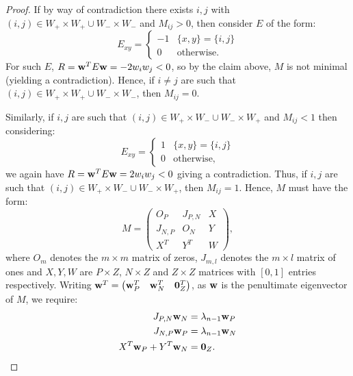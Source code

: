 \documentclass[12pt]{article}
\begin{document}
\begin{proof}
    If by way of contradiction there exists $i,j$ with $(i,j) \in W_{+}\times W_{+} \cup W_{-}\times W_{-}$ and $M_{ij} > 0$, then consider $E$ of the form:
    \begin{equation*}
        E_{xy} = \begin{cases} -1 & \{x,y\} = \{i,j\} \\ 0 & \text{otherwise.}
        \end{cases}
    \end{equation*}
    For such $E$, $R = \bold{w}^{T}E\bold{w} = -2w_iw_j < 0$, so by the claim above, $M$ is not minimal (yielding a contradiction). Hence, if $i\ne j$ are such that $(i,j) \in W_{+}\times W_{+} \cup W_{-}\times W_{-}$, then $M_{ij} = 0$.  
    
    Similarly, if $i,j$ are such that $(i,j) \in W_{+}\times W_{-} \cup W_{-}\times W_{+}$ and $M_{ij}<1$ then considering:
    \begin{equation*}
        E_{xy} = \begin{cases} 1 & \{x,y\} = \{i,j\} \\ 0 & \text{otherwise,}
        \end{cases}
    \end{equation*}
    we again have $R = \bold{w}^{T}E\bold{w} = 2w_iw_j < 0$ giving a contradiction. Thus, if $i,j$ are such that $(i,j) \in W_{+}\times W_{-} \cup W_{-}\times W_{+}$, then $M_{ij}=1$. Hence, $M$ must have the form:
    \begin{equation*}
        M = \begin{pmatrix} O_{P} & J_{P,N} & X \\ J_{N,P} & O_{N} & Y \\ X^T & Y^T & W
        \end{pmatrix},
    \end{equation*}
    where $O_m$ denotes the $m\times m$ matrix of zeros, $J_{m,l}$ denotes the $m\times l$ matrix of ones and $X,Y,W$ are $P\times Z$, $N\times Z$ and $Z\times Z$ matrices with $[0,1]$ entries respectively. Writing $\bold{w}^T = \begin{pmatrix}\bold{w}^T_P & \bold{w}^T_N & \bold{0}_{Z}^T\end{pmatrix}$, as $\bold{w}$ is the penultimate eigenvector of $M$, we require:
    \begin{align*}
        J_{P,N}\bold{w}_{N} & = \lambda_{n-1} \bold{w}_{P} \\
        J_{N,P}\bold{w}_{P} & = \lambda_{n-1} \bold{w}_{N} \\
        X^T\bold{w}_{P} + Y^T\bold{w}_{N} & = \bold{0}_{Z}.

\end{align*}
\end{proof}
\end{document}
